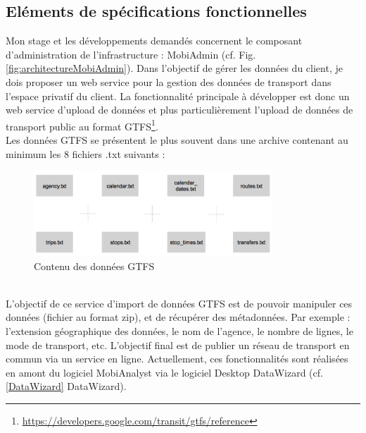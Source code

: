 \subsection{Eléments de spécifications fonctionnelles}

Mon stage et les développements demandés concernent le composant d'administration de l'infrastructure : \og MobiAdmin \fg (cf. Fig. \ref{fig:architectureMobiAdmin}). Dans l'objectif de gérer les données du client, je dois proposer un web service pour la gestion des données de transport dans l'espace privatif du client.
La fonctionnalité principale à développer est donc un web service d'upload de données et plus particulièrement l'upload de données de transport public au format GTFS\footnote{\url{https://developers.google.com/transit/gtfs/reference}}.\\ 

Les données GTFS se présentent le plus souvent dans une archive contenant au minimum les 8 fichiers .txt suivants :
\\
\begin{figure}[h]
	\centering
		\includegraphics[width=0.8\textwidth]{images/GTFS_8fichiers.png}
	\caption{Contenu des données GTFS}
	\label{fig:GTFS_8fichiers}
\end{figure}\\


L'objectif de ce service d'import de données GTFS est de pouvoir manipuler ces données (fichier au format zip), et de récupérer des métadonnées. Par exemple : l'extension géographique des données, le nom de l'agence, le nombre de lignes, le mode de transport, etc. L'objectif final est de publier un réseau de transport en commun via un service en ligne. Actuellement, ces fonctionnalités sont réalisées en amont du logiciel MobiAnalyst via le logiciel Desktop DataWizard (cf. \ref{DataWizard} DataWizard).\\

